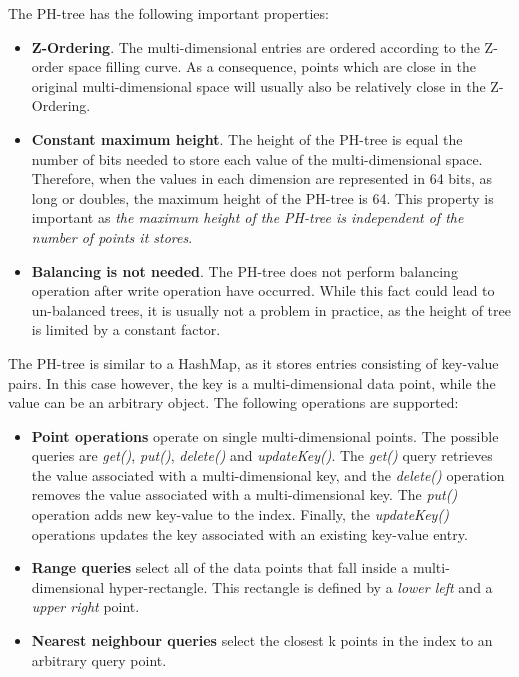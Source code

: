 \documentclass[11pt,a4paper]{globis-book}
\begin{document}
The PH-tree has the following important properties:
\begin{itemize}
    \item \textbf{Z-Ordering}. The multi-dimensional entries are ordered according to the Z-order space filling curve. As a consequence, points which are close in the original multi-dimensional space will usually also be relatively close in the Z-Ordering.
    \item \textbf{Constant maximum height}. The height of the PH-tree is equal the number of bits needed to store each value of the multi-dimensional space. Therefore, when the values in each dimension are represented in 64 bits, as long or doubles, the maximum height of the PH-tree is 64. This property is important as \textit{the maximum height of the PH-tree is independent of the number of points it stores}.
    \item \textbf{Balancing is not needed}. The PH-tree does not perform balancing operation after write operation have occurred. While this fact could lead to un-balanced trees, it is usually not a problem in practice, as the height of tree is limited by a constant factor.
\end{itemize}

The PH-tree is similar to a HashMap, as it stores entries consisting of key-value pairs. In this case however, the key is a multi-dimensional data point, while the value can be an arbitrary object. The following operations are supported:
\begin{itemize}
    \item \textbf{Point operations} operate on single multi-dimensional points. The possible queries are \textit{get()}, \textit{put()}, \textit{delete()} and \textit{updateKey()}. The \textit{get()} query retrieves the value associated with a multi-dimensional key, and the \textit{delete()} operation removes the value associated with a multi-dimensional key. The \textit{put()} operation adds new key-value to the index. Finally, the \textit{updateKey()} operations updates the key associated with an existing key-value entry.
    \item \textbf{Range queries} select all of the data points that fall inside a multi-dimensional hyper-rectangle. This rectangle is defined by a \textit{lower left} and a \textit{upper right} point. 
    \item \textbf{Nearest neighbour queries} select the closest k points in the index to an arbitrary query point. 
\end{itemize}
\end{document}
